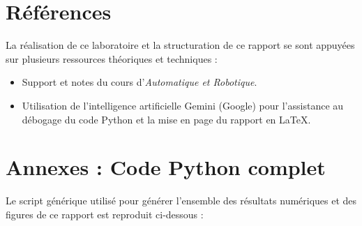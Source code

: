 \documentclass[11pt,a4paper]{article}
\begin{document}
\section{Références}

La réalisation de ce laboratoire et la structuration de ce rapport se sont appuyées sur plusieurs ressources théoriques et techniques :

\begin{itemize}
    \item Support et notes du cours d'\textit{Automatique et Robotique}.
    \item Utilisation de l'intelligence artificielle Gemini (Google) pour l'assistance au débogage du code Python et la mise en page du rapport en \LaTeX.
\end{itemize}

\newpage

\section{Annexes : Code Python complet}

Le script générique utilisé pour générer l'ensemble des résultats numériques et des figures de ce rapport est reproduit ci-dessous :
\end{document}
